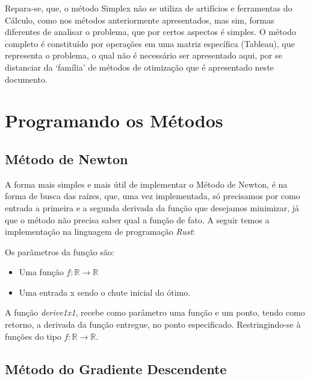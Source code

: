 Repara-se, que, o método Simplex não se utiliza de artifícios e ferramentas do
Cálculo, como nos métodos anteriormente apresentados, mas sim, formas
diferentes de analisar o problema, que por certos aspectos é simples. O método
completo é constituído por operações em uma matriz específica (Tableau), que
representa o problema, o qual não é necessário ser apresentado aqui, por se
distanciar da `família' de métodos de otimização que é apresentado neste
documento.



\section{{Programando os Métodos}}

\hspace{0.8cm}

\subsection{Método de Newton}

\hspace{0.8cm}
A forma mais simples e mais útil de implementar o Método de Newton, é na forma
de busca das raízes, que, uma vez implementada, só precisamos por como entrada
a primeira e a segunda derivada da função que desejamos minimizar, já que o
método não precisa saber qual a função de fato. A seguir temos a implementação
na linguagem de programação \textit{Rust}:
\vspace{0.2cm}


Os parâmetros da função são:

    \begin{itemize}
            \item Uma função \(f : \mathbb{R} \rightarrow \mathbb{R}\)
            \item Uma entrada x sendo o chute inicial do ótimo.
    \end{itemize}


A função \textit{derive1x1}, recebe como parâmetro uma função e um ponto,
tendo como retorno, a derivada da função entregue, no ponto especificado.
Restringindo-se à funções do tipo \(f : \mathbb{R} \rightarrow \mathbb{R}\).


\subsection{Método do Gradiente Descendente}

